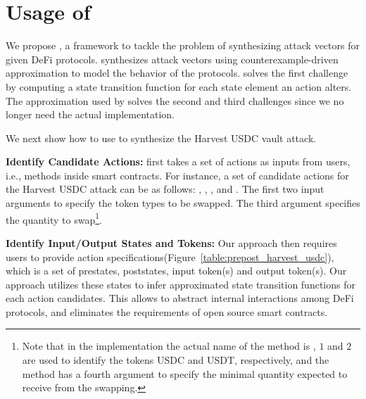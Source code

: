 \section{Usage of \name{}}
We propose \name{}, a framework to tackle the problem of synthesizing attack vectors for given DeFi protocols. 
\name{} synthesizes attack vectors using counterexample-driven approximation to model the behavior of the protocols. 
\name{} solves the first challenge by computing a state transition function for
each state element an action alters. The approximation used by \name{} solves
the second and third challenges since we no longer need the actual
implementation. 

We next show how to use {\name} to synthesize the Harvest USDC vault attack. 

\noindent \textbf{Identify Candidate Actions: }
\name{} first takes a set of actions as inputs from users, i.e., methods inside smart contracts. 
For instance, a set of candidate actions for the Harvest USDC attack can be as
follows: , ,
, and . The first two
input arguments to  specify the token types to be swapped.
The third argument specifies the quantity to swap\footnote{Note that in the
implementation the actual name of the  method is
, $1$ and $2$ are used to identify the tokens
USDC and USDT, respectively, and the method has a fourth argument to specify
the minimal quantity expected to receive from the swapping.}.


\noindent \textbf{Identify Input/Output States and Tokens: }
Our approach then requires users to provide action specifications(Figure~\ref{table:prepost_harvest_usdc}), which is a set of prestates, poststates, input token(s) and output token(s). Our approach utilizes these states to infer approximated state transition functions for each action candidates. This allows to abstract internal interactions among DeFi protocols, and eliminates the requirements of open source smart contracts. 

